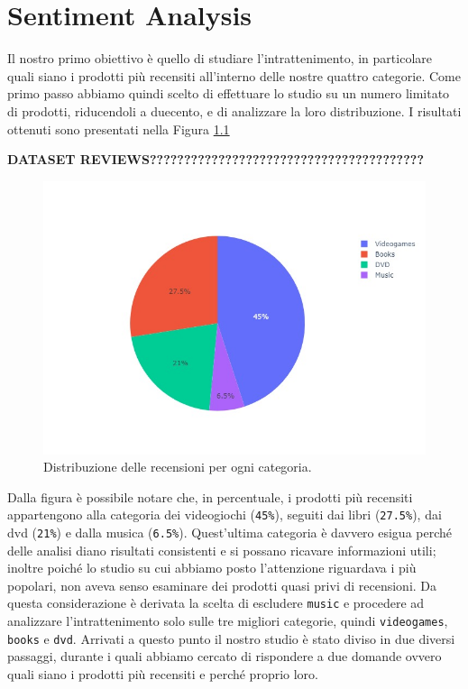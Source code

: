 \chapter{Sentiment Analysis}   
	Il nostro primo obiettivo è quello di studiare l'intrattenimento, in particolare quali siano i prodotti più recensiti all'interno delle nostre quattro categorie. Come primo passo abbiamo  quindi scelto di effettuare lo studio su un numero limitato di prodotti, riducendoli a duecento, e di analizzare la loro distribuzione. I risultati ottenuti sono presentati nella Figura \ref{fig:pie_category}
	
	
	\textbf{DATASET REVIEWS????????????????????????????????????????}
		
	\begin{figure} [h]
		\includegraphics[width=\textwidth]{Figure/pie_category}	
		\caption{Distribuzione delle recensioni per ogni categoria.}
		\label{fig:pie_category}
	\end{figure}
	
	Dalla figura è possibile notare che, in percentuale, i prodotti più recensiti appartengono alla categoria dei videogiochi (\verb|45%|), seguiti dai libri (\verb|27.5%|), dai dvd (\verb|21%|) e dalla musica (\verb|6.5%|). Quest'ultima categoria è davvero esigua perché delle analisi diano risultati consistenti e si possano ricavare informazioni utili; inoltre poiché lo studio su cui abbiamo posto l'attenzione riguardava i più popolari, non aveva senso esaminare dei prodotti quasi privi di recensioni. Da questa considerazione è derivata la scelta di escludere \verb|music| e procedere ad analizzare l'intrattenimento solo sulle tre migliori categorie, quindi \verb|videogames|, \verb|books| e \verb|dvd|. Arrivati a questo punto il nostro studio è stato diviso in due diversi passaggi, durante i quali abbiamo cercato di rispondere a due domande ovvero quali siano i prodotti più recensiti e perché proprio loro. 
		
